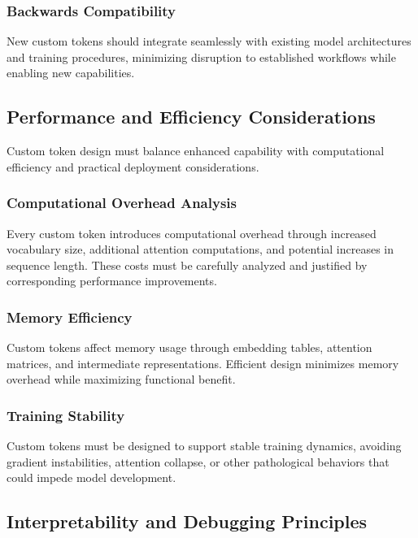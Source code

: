 \subsubsection{Backwards Compatibility}

New custom tokens should integrate seamlessly with existing model architectures and training procedures, minimizing disruption to established workflows while enabling new capabilities.

\subsection{Performance and Efficiency Considerations}

Custom token design must balance enhanced capability with computational efficiency and practical deployment considerations.

\subsubsection{Computational Overhead Analysis}

Every custom token introduces computational overhead through increased vocabulary size, additional attention computations, and potential increases in sequence length. These costs must be carefully analyzed and justified by corresponding performance improvements.

\subsubsection{Memory Efficiency}

Custom tokens affect memory usage through embedding tables, attention matrices, and intermediate representations. Efficient design minimizes memory overhead while maximizing functional benefit.

\subsubsection{Training Stability}

Custom tokens must be designed to support stable training dynamics, avoiding gradient instabilities, attention collapse, or other pathological behaviors that could impede model development.

\subsection{Interpretability and Debugging Principles}

